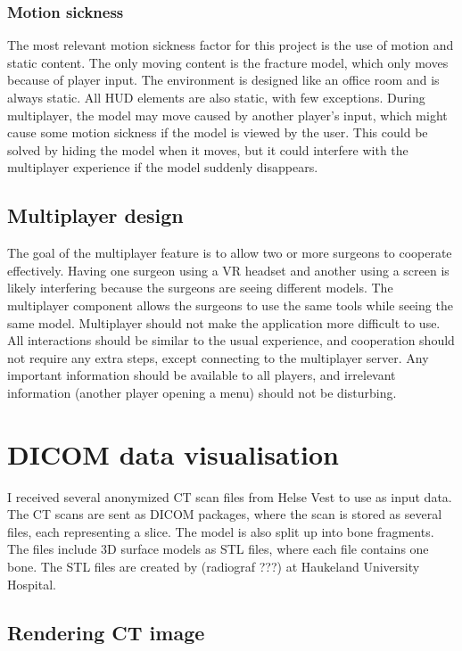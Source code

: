 \documentclass[a4paper]{report}
\begin{document}
\subsubsection{Motion sickness}
The most relevant motion sickness factor for this project is the use of motion and static content. The only moving content is the fracture model, which only moves because of player input. The environment is designed like an office room and is always static. All HUD elements are also static, with few exceptions.
During multiplayer, the model may move caused by another player's input, which might cause some motion sickness if the model is viewed by the user. This could be solved by hiding the model when it moves, but it could interfere with the multiplayer experience if the model suddenly disappears.

\subsection{Multiplayer design}
The goal of the multiplayer feature is to allow two or more surgeons to cooperate effectively. Having one surgeon using a VR headset and another using a screen is likely interfering because the surgeons are seeing different models. The multiplayer component allows the surgeons to use the same tools while seeing the same model.
Multiplayer should not make the application more difficult to use. All interactions should be similar to the usual experience, and cooperation should not require any extra steps, except connecting to the multiplayer server. Any important information should be available to all players, and irrelevant information (another player opening a menu) should not be disturbing.



\section{DICOM data visualisation}
I received several anonymized CT scan files from Helse Vest to use as input data. The CT scans are sent as DICOM packages\cite{noauthor_dicom_nodate}, where the scan is stored as several files, each representing a slice.
The model is also split up into bone fragments. The files include 3D surface models as STL files, where each file contains one bone. The STL files are created by (radiograf ???) at Haukeland University Hospital.


\subsection{Rendering CT image}
\end{document}
